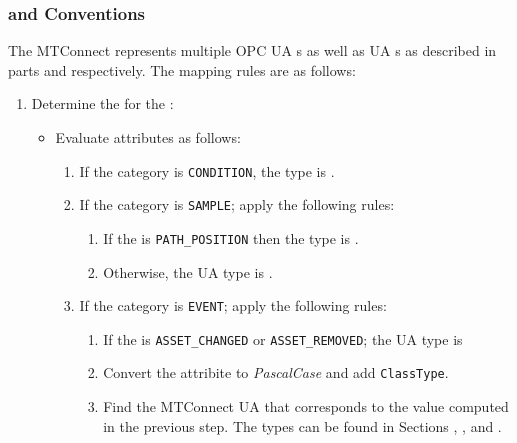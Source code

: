 \subsubsection{  and  Conventions}
\label{sec:data-item-conventions}

The MTConnect  represents multiple OPC UA s as well as UA s as described in parts \cite{UAPart8} and \cite{UAPart9} respectively. The mapping rules are as follows:

\begin{enumerate}
  \item Determine the   for the  :
  \begin{itemize}
    \item Evaluate  attributes as follows:
    \begin{enumerate}
      \setlength\itemsep{1em}
      \item If the category is \texttt{CONDITION}, the type is .
      
      \item If the category is \texttt{SAMPLE}; apply the following rules:
      \begin{enumerate}
        \item If the  is \texttt{PATH_POSITION} then the type is .
        \item Otherwise, the UA type is .
      \end{enumerate}
      
      \item If the category is \texttt{EVENT}; apply the following rules:
      \begin{enumerate}
        \setlength\itemsep{1em}
        \item If the  is \texttt{ASSET_CHANGED} or \texttt{ASSET_REMOVED}; the UA type is 
        
        \item Convert the  attribite to \textit{PascalCase} and add \texttt{ClassType}.
        
        \item Find the MTConnect UA  that corresponds to the value computed in the previous step.
        The types can be found in Sections , , and .
        

\end{enumerate}
\end{enumerate}
\end{itemize}
\end{enumerate}
